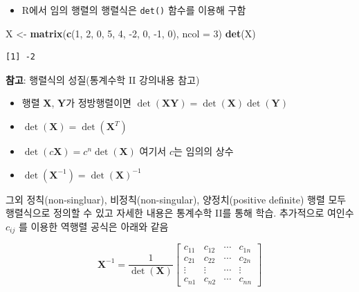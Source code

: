 \documentclass[
  11pt,
]{krantz}
\makeatletter
\newenvironment{Shaded}{\begin{snugshade}}{\end{snugshade}}
\newcommand{\DataTypeTok}[1]{\textcolor[rgb]{0.27,0.27,0.27}{#1}}
\newcommand{\DecValTok}[1]{\textcolor[rgb]{0.06,0.06,0.06}{#1}}
\newcommand{\KeywordTok}[1]{\textcolor[rgb]{0.27,0.27,0.27}{\textbf{#1}}}
\newcommand{\NormalTok}[1]{#1}
\newcommand{\StringTok}[1]{\textcolor[rgb]{0.5,0.5,0.5}{#1}}
\providecommand{\tightlist}{%
  \setlength{\itemsep}{0pt}\setlength{\parskip}{0pt}}
\newenvironment{kframe}{%
\medskip{}
\setlength{\fboxsep}{.8em}
 \def\at@end@of@kframe{}%
 \ifinner\ifhmode%
  \def\at@end@of@kframe{\end{minipage}}%
  \begin{minipage}{\columnwidth}%
 \fi\fi%
 \def\FrameCommand##1{\hskip\@totalleftmargin \hskip-\fboxsep
 \colorbox{shadecolor}{##1}\hskip-\fboxsep
     \hskip-\linewidth \hskip-\@totalleftmargin \hskip\columnwidth}%
 \MakeFramed {\advance\hsize-\width
   \@totalleftmargin\z@ \linewidth\hsize
   \@setminipage}}%
 {\par\unskip\endMakeFramed%
 \at@end@of@kframe}
\newenvironment{rmdblock}[1]
  {
  \begin{itemize}
  \renewcommand{\labelitemi}{
    \raisebox{-.7\height}[0pt][0pt]{
      {\setkeys{Gin}{width=3em,keepaspectratio}\texttt{[image: images/\#1]}}
    }
  }
  \setlength{\fboxsep}{1em}
  \begin{kframe}
  \item
  }
  {
  \end{kframe}
  \end{itemize}
  }
\newenvironment{rmdtip}
  {\begin{rmdblock}{tip}}
  {\end{rmdblock}}
\makeatother
\begin{document}
\begin{itemize}
\tightlist
\item
  R에서 임의 행렬의 행렬식은 \texttt{det()} 함수를 이용해 구함
\end{itemize}

\footnotesize

\begin{Shaded}
\begin{Highlighting}[]
\NormalTok{X <-}\StringTok{ }\KeywordTok{matrix}\NormalTok{(}\KeywordTok{c}\NormalTok{(}\DecValTok{1}\NormalTok{, }\DecValTok{2}\NormalTok{, }\DecValTok{0}\NormalTok{, }\DecValTok{5}\NormalTok{, }\DecValTok{4}\NormalTok{, }\DecValTok{-2}\NormalTok{, }\DecValTok{0}\NormalTok{, }\DecValTok{-1}\NormalTok{, }\DecValTok{0}\NormalTok{), }\DataTypeTok{ncol =} \DecValTok{3}\NormalTok{)}
\KeywordTok{det}\NormalTok{(X)}
\end{Highlighting}
\end{Shaded}

\begin{verbatim}
[1] -2
\end{verbatim}

\normalsize

\footnotesize

\begin{rmdtip}
\begin{rmdtip}

\textbf{참고}: 행렬식의 성질(통계수학 II 강의내용 참고)

\begin{itemize}
\tightlist
\item
  행렬 \(\mathrm{\mathbf{X}}\), \(\mathrm{\mathbf{Y}}\)가 정방행렬이면 \(\det(\mathrm{\mathbf{XY}}) = \det(\mathrm{\mathbf{X}})\det(\mathrm{\mathbf{Y}})\)
\item
  \(\det(\mathrm{\mathbf{X}}) = \det(\mathrm{\mathbf{X}}^T)\)
\item
  \(\det(c\mathrm{\mathbf{X}}) = c^n \det(\mathrm{\mathbf{X}})\) 여기서 \(c\)는 임의의 상수
\item
  \(\det(\mathrm{\mathbf{X}}^{-1}) = \det(\mathrm{\mathbf{X}})^{-1}\)
\end{itemize}

그외 정칙(non-singluar), 비정칙(non-singular), 양정치(positive definite) 행렬 모두 행렬식으로 정의할 수 있고 자세한 내용은 통계수학 II를 통해 학습. 추가적으로 여인수 \(c_{ij}\) 를 이용한 역행렬 공식은 아래와 같음

\[\mathrm{\mathbf{X}}^{-1} = \frac{1}{\det(\mathrm{\mathbf{X}})}
\begin{bmatrix}
c_{11} & c_{12} &  \cdots & c_{1n} \\
c_{21} & c_{22} &  \cdots & c_{2n} \\
\vdots & \vdots & \cdots & \vdots \\
c_{n1} & c_{n2}  & \cdots & c_{nn}
\end{bmatrix}
\]

\end{rmdtip}
\end{rmdtip}
\end{document}

